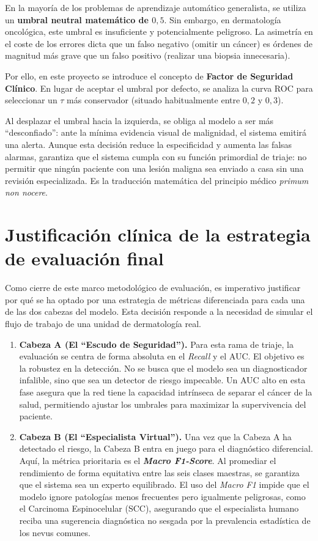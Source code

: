 En la mayoría de los problemas de aprendizaje automático generalista, se utiliza un \textbf{umbral neutral matemático de $0,5$}. Sin embargo, en dermatología oncológica, este umbral es insuficiente y potencialmente peligroso. La asimetría en el coste de los errores dicta que un falso negativo (omitir un cáncer) es órdenes de magnitud más grave que un falso positivo (realizar una biopsia innecesaria).



Por ello, en este proyecto se introduce el concepto de \textbf{Factor de Seguridad Clínico}. En lugar de aceptar el umbral por defecto, se analiza la curva ROC para seleccionar un $\tau$ más conservador (situado habitualmente entre $0,2$ y $0,3$).

Al desplazar el umbral hacia la izquierda, se obliga al modelo a ser más ``desconfiado'': ante la mínima evidencia visual de malignidad, el sistema emitirá una alerta. Aunque esta decisión reduce la especificidad y aumenta las falsas alarmas, garantiza que el sistema cumpla con su función primordial de triaje: no permitir que ningún paciente con una lesión maligna sea enviado a casa sin una revisión especializada. Es la traducción matemática del principio médico \textit{primum non nocere}.

\section{Justificación clínica de la estrategia de evaluación final}

Como cierre de este marco metodológico de evaluación, es imperativo justificar por qué se ha optado por una estrategia de métricas diferenciada para cada una de las dos cabezas del modelo. Esta decisión responde a la necesidad de simular el flujo de trabajo de una unidad de dermatología real.

\begin{enumerate}
	\item \textbf{Cabeza A (El ``Escudo de Seguridad'').} Para esta rama de triaje, la evaluación se centra de forma absoluta en el \textit{Recall} y el AUC. El objetivo es la robustez en la detección. No se busca que el modelo sea un diagnosticador infalible, sino que sea un detector de riesgo impecable. Un AUC alto en esta fase asegura que la red tiene la capacidad intrínseca de separar el cáncer de la salud, permitiendo ajustar los umbrales para maximizar la supervivencia del paciente.
	
	\item \textbf{Cabeza B (El ``Especialista Virtual'').} Una vez que la Cabeza A ha detectado el riesgo, la Cabeza B entra en juego para el diagnóstico diferencial. Aquí, la métrica prioritaria es el \textbf{\textit{Macro F1-Score}}. Al promediar el rendimiento de forma equitativa entre las seis clases maestras, se garantiza que el sistema sea un experto equilibrado. El uso del \textit{Macro F1} impide que el modelo ignore patologías menos frecuentes pero igualmente peligrosas, como el Carcinoma Espinocelular (SCC), asegurando que el especialista humano reciba una sugerencia diagnóstica no sesgada por la prevalencia estadística de los nevus comunes.
\end{enumerate}

